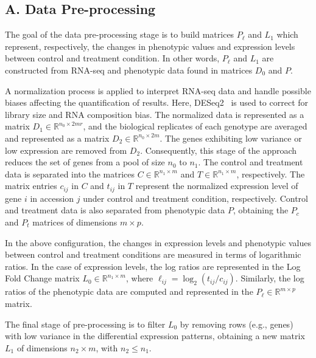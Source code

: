 \subsection*{A. Data Pre-processing}

The goal of the data pre-processing stage is to build matrices
$P_\ell$ and $L_1$ which represent, respectively, the changes in
phenotypic values and expression levels between control and treatment
condition. In other words, $P_\ell$ and $L_1$ are constructed from RNA-seq and phenotypic data found in matrices $D_0$
and $P$.
\vspace{0.5cm}

A normalization process is applied to interpret RNA-seq data and handle possible
biases affecting the quantification of results. Here,  DESeq2~\cite{love2014moderated}
is used to correct for library size and RNA
composition bias. The normalized
data is represented as a matrix $D_1 \in \mathbb{R}^{n_0 \times 2mr}$,
and the biological replicates of each genotype are averaged and
represented as a matrix $D_2 \in \mathbb{R}^{n_0 \times 2m}$. The
genes exhibiting low variance or low expression are removed from
$D_2$. Consequently, this stage of the approach reduces
the set of genes from a pool of size $n_0$ to $n_1$.
The control and treatment data is separated into the
matrices $C\in \mathbb{R}^{n_1 \times m}$ and $T\in \mathbb{R}^{n_1
  \times m}$, respectively. The matrix entries $c_{ij}$ in $C$ and
$t_{ij}$ in $T$ represent the normalized expression
level of gene $i$ in accession $j$ under control and treatment 
condition, respectively.
Control and treatment data is also separated from
phenotypic data $P$, obtaining the $P_c$ and $P_t$ matrices of
dimensions $m \times p$.
\vspace{0.5cm}

In the above configuration, the changes in expression levels and
phenotypic values between control and treatment conditions are
measured in terms of logarithmic ratios. In the case of expression
levels, the log ratios are represented in the Log Fold Change matrix
$L_0 \in \mathbb{R}^{n_1 \times m}$, where $\ell_{ij}=\log_2
(t_{ij}/c_{ij})$. Similarly, the log ratios of the phenotypic data are
computed and represented in the $P_\ell \in \mathbb{R}^{m \times p}$
matrix.
\vspace{0.5cm}

The final stage of pre-processing is to filter $L_0$ by
removing rows (e.g., genes) with low variance in the differential
expression patterns, obtaining a new matrix $L_1$ of dimensions $n_2
\times m$, with $n_2 \leq n_1$.

